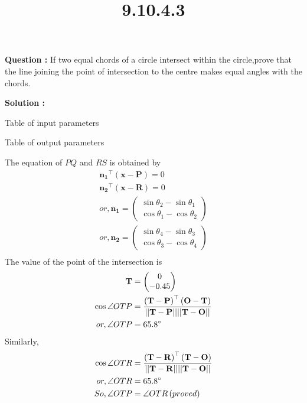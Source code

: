 \documentclass[12pt]{article}
\providecommand{\brak}[1]{\ensuremath{\left(#1\right)}}
\providecommand{\myvec}[1]{\ensuremath{\begin{pmatrix}#1\end{pmatrix}}}
\providecommand{\norm}[1]{\ensuremath{\lvert|#1\rvert|}}
\let\vec\mathbf
\begin{document}
\title{\textbf{9.10.4.3}}
\date{}
\maketitle
\textbf{Question :} If two equal chords of a circle intersect within the circle,prove that the line joining the point of intersection to the centre makes equal angles with the chords.

\textbf{Solution :}

\begin{table}[H]
    \centering
    
    \caption{Table of input parameters}
    \label{tab:tab:1}
\end{table}

\begin{table}[]
    \centering

\caption{Table of output parameters}
    \label{tab:tab:2}
\end{table}
The equation of $PQ$ and $RS$ is obtained by
\begin{align}
  \vec{n_1}^{\top}\vec{\brak{x-P}}=0\\
  \vec{n_2}^{\top}\vec{\brak{x-R}}=0\\
  or,\vec{n_1}=\myvec{\sin{\theta_2}-\sin{\theta_1}\\\cos{\theta_1}-\cos{\theta_2}}\\
  or,\vec{n_2}=\myvec{\sin{\theta_4}-\sin{\theta_3}\\\cos{\theta_3}-\cos{\theta_4}}\\
  \end{align}
  The value of the point of the intersection is
  \begin{align}
      \vec{T} &= \myvec{0\\-0.45}\\
\cos{\angle OTP} &= \frac{\brak{\vec{T-P}}^{\top}\brak{\vec{O-T}}}{\vec{\norm{T-P}\norm{T-O}}}\\
or, \angle OTP&= 65.8\degree
\end{align}
Similarly,
\begin{align}
   \cos{\angle OTR} &= \frac{\brak{\vec{T-R}}^{\top}\brak{\vec{T-O}}}{\vec{\norm{T-R}\norm{T-O}}}\\
or, \angle OTR&= 65.8\degree \\
So,\angle OTP &= \angle OTR \brak{proved}
\end{align}
\end{document}
